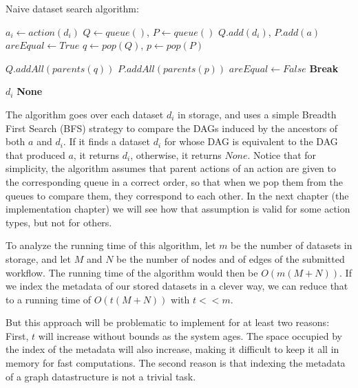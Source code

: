 \begin{algorithm}
\begin{singlespace}
\caption{Naive dataset search algorithm:}
\label{alg:dataset_search}
\begin{algorithmic}[1]
		\State $a_i \gets action(d_i)$ 
		\State $Q \gets queue()$, $P \gets queue()$
		\State $Q.add(d_i)$, $P.add(a)$
		\State $areEqual \gets True$
			\State $q \gets pop(Q)$, $p \gets pop(P)$
			
				\State $Q.addAll(parents(q))$ 
				\State $P.addAll(parents(p))$ 
			\Else
				\State $areEqual \gets False$
				\State \textbf{Break}
			\EndIf
			
		\EndWhile
			\Return $d_i$
		\EndIf
	\EndFor
	\Return \textbf{None}
\EndProcedure
\end{algorithmic}
\end{singlespace}
\end{algorithm}

The algorithm goes over each dataset $d_i$ in storage, and uses a simple Breadth First Search (BFS) strategy to compare the DAGs induced by the ancestors of both $a$ and $d_i$.  If it finds a dataset $d_i$ for whose DAG is equivalent to the DAG that produced $a$, it returns $d_i$, otherwise, it returns $None$.  Notice that for simplicity, the algorithm assumes that parent actions of an action are given to the corresponding queue in a correct order, so that when we pop them from the queues to compare them, they correspond to each other.  In the next chapter (the implementation chapter) we will see how that assumption is valid for some action types, but not for others.

To analyze the running time of this algorithm, let $m$ be the number of datasets in storage, and let $M$ and $N$ be the number of nodes and of edges of the submitted workflow.  The running time of the algorithm would then be $O(m (M + N))$.  If we index the metadata of our stored datasets in a clever way, we can reduce that to a running time of $O(t (M + N))$ with $t << m$.

But this approach will be problematic to implement for at least two reasons: First, $t$ will increase without bounds as the system ages. The space occupied by the index of the metadata will also increase, making it difficult to keep it all in memory for fast computations. The second reason is that indexing the metadata of a graph datastructure is not a trivial task.

